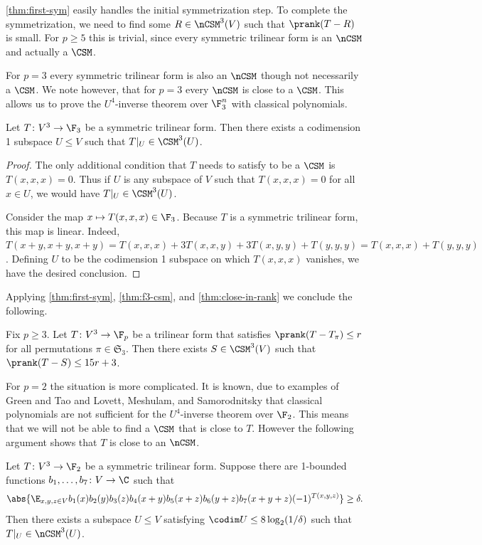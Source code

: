 \cref{thm:first-sym} easily handles the initial symmetrization step. To complete the symmetrization, we need to find some $R\in\nCSM^3(V)$ such that $\prank(T-R)$ is small. For $p\geq 5$ this is trivial, since every symmetric trilinear form is an $\nCSM$ and actually a $\CSM$.

For $p=3$ every symmetric trilinear form is also an $\nCSM$ though not necessarily a $\CSM$. We note however, that for $p=3$ every $\nCSM$ is close to a $\CSM$. This allows us to prove the $U^4$-inverse theorem over $\F_3^n$ with classical polynomials.

\begin{prop}
\label{thm:f3-csm}
Let $T\colon V^3\to\F_3$ be a symmetric trilinear form. Then there exists a codimension 1 subspace $U\leq V$ such that $T|_U\in\CSM^3(U)$.
\end{prop}

\begin{proof}
The only additional condition that $T$ needs to satisfy to be a $\CSM$ is $T(x,x,x)=0$. Thus if $U$ is any subspace of $V$ such that $T(x,x,x)=0$ for all $x\in U$, we would have $T|_U\in\CSM^3(U)$.

Consider the map $x\mapsto T(x,x,x)\in\F_3$. Because $T$ is a symmetric trilinear form, this map is linear. Indeed, $T(x+y,x+y,x+y)=T(x,x,x)+3T(x,x,y)+3T(x,y,y)+T(y,y,y)=T(x,x,x)+T(y,y,y)$. Defining $U$ to be the codimension 1 subspace on which $T(x,x,x)$ vanishes, we have the desired conclusion.
\end{proof}

Applying \cref{thm:first-sym}, \cref{thm:f3-csm}, and \cref{thm:close-in-rank} we conclude the following.

\begin{cor}
\label{thm:f3-csm-cor}
Fix $p\geq 3$. Let $T\colon V^3\to\F_p$ be a trilinear form that satisfies $\prank(T-T_\pi)\leq r$ for all permutations $\pi\in\mathfrak S_3$. Then there exists $S\in\CSM^3(V)$ such that $\prank(T-S)\leq 15r+3$.
\end{cor}

For $p=2$ the situation is more complicated. It is known, due to examples of Green and Tao \cite{GT09} and Lovett, Meshulam, and Samorodnitsky \cite{LMS11} that classical polynomials are not sufficient for the $U^4$-inverse theorem over $\F_2$. This means that we will not be able to find a $\CSM$ that is close to $T$. However the following argument shows that $T$ is close to an $\nCSM$.

\begin{prop}
\label{thm:f2-ncsm}
Let $T\colon V^3\to\F_2$ be a symmetric trilinear form. Suppose there are 1-bounded functions $b_1,\ldots,b_7\colon V\to\C$ such that
\[\abs{\E_{x,y,z\in V}b_1(x)b_2(y)b_3(z)b_4(x+y)b_5(x+z)b_6(y+z)b_7(x+y+z)(-1)^{T(x,y,z)}}\geq\delta.\]
Then there exists a subspace $U\leq V$ satisfying $\codim U\leq 8\log_2(1/\delta)$ such that $T|_U\in\nCSM^3(U)$.
\end{prop}

